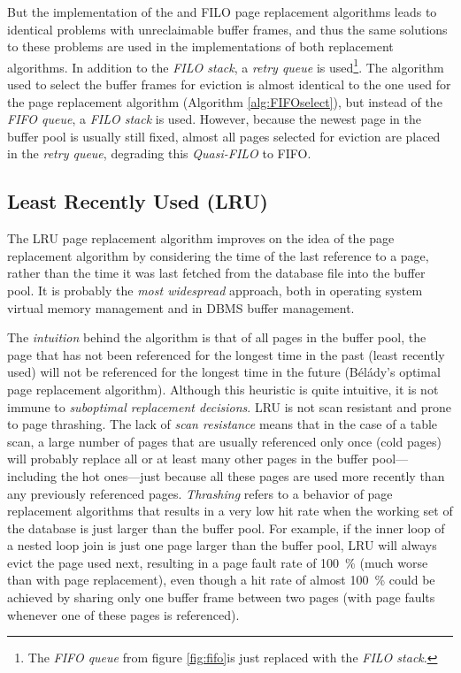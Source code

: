     But the implementation of the  and FILO page replacement algorithms leads to identical problems with unreclaimable buffer frames, and thus the same solutions to these problems are used in the implementations of both replacement algorithms. In addition to the \textit{FILO stack}, a \textit{retry queue} is used\footnote{The \textit{FIFO queue} from figure \ref{fig:fifo}is just replaced with the \textit{FILO stack}.}. The algorithm used to select the buffer frames for eviction is almost identical to the one used for the  page replacement algorithm (Algorithm \ref{alg:FIFOselect}), but instead of the \textit{FIFO queue}, a \textit{FILO stack} is used. However, because the newest page in the buffer pool is usually still fixed, almost all pages selected for eviction are placed in the \textit{retry queue}, degrading this \emph{Quasi-FILO} to FIFO.

\subsection[LRU]{Least Recently Used (LRU)} \label{subsec:lru}

    The LRU page replacement algorithm improves on the idea of the  page replacement algorithm by considering the time of the last reference to a page, rather than the time it was last fetched from the database file into the buffer pool.  It is probably the \emph{most widespread} approach, both in operating system virtual memory management and in DBMS buffer management.

    The \emph{intuition} behind the algorithm is that of all pages in the buffer pool, the page that has not been referenced for the longest time in the past (least recently used) will not be referenced for the longest time in the future (Bélády's optimal page replacement algorithm). Although this heuristic is quite intuitive, it is not immune to \emph{suboptimal replacement decisions}. LRU is not scan resistant and prone to page thrashing. The lack of \emph{scan resistance} means that in the case of a table scan, a large number of pages that are usually referenced only once (cold pages) will probably replace all or at least many other pages in the buffer pool---including the hot ones---just because all these pages are used more recently than any previously referenced pages. \emph{Thrashing} refers to a behavior of page replacement algorithms that results in a very low hit rate when the working set of the database is just larger than the buffer pool. For example, if the inner loop of a nested loop join is just one page larger than the buffer pool, LRU will always evict the page used next, resulting in a page fault rate of \SI{100}{\percent} (much worse than with  page replacement), even though a hit rate of almost \SI{100}{\percent} could be achieved by sharing only one buffer frame between two pages (with page faults whenever one of these pages is referenced).

